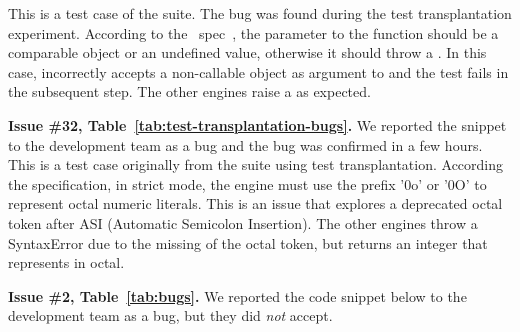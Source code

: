 \documentclass[smallextended]{svjour3}
\begin{document}
This is a test case of the \jerry{} suite. The bug was found during
the test transplantation experiment. According to the
\es\ spec~\cite{ecmas262-array-sort}, the parameter to the
 function should be a comparable object or an
undefined value, otherwise it should throw a . In
this case, \jsc incorrectly accepts a non-callable object as argument
to  and the test fails in the subsequent step. The other
engines raise a  as expected.

\vspace{1ex}\noindent\textbf{Issue \#32, Table~\ref{tab:test-transplantation-bugs}.} We
reported the snippet  to the
\textbf{\smonkey} development team as a bug and the bug was confirmed
in a few hours.  This is a test case originally from the \hermes suite
using test transplantation.  According the specification, in strict
mode, the engine must use the prefix '0o' or '0O' to represent octal
numeric literals. This is an issue that explores a deprecated octal
token after ASI (Automatic Semicolon Insertion). The other engines
throw a SyntaxError due to the missing of the octal token, but \smonkey
returns an integer  that represents  in octal.





\vspace{1ex}\noindent\textbf{Issue \#2, Table~\ref{tab:bugs}.} We
reported the code snippet below to the \textbf{\chakra} development team as a
bug, but they did \emph{not} accept.
\end{document}
